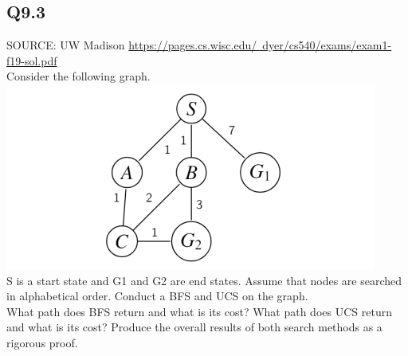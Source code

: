 \documentclass{article}
\begin{document}
\subsection*{Q9.3}
SOURCE: UW Madison \href{https://pages.cs.wisc.edu/~dyer/cs540/exams/exam1-f19-sol.pdf}{https://pages.cs.wisc.edu/~dyer/cs540/exams/exam1-f19-sol.pdf}
\\ Consider the following graph.
\\ \includegraphics{UCS_question_graph.png}
\\ S is a start state and G1 and G2 are end states. Assume that nodes are searched in alphabetical order. Conduct a BFS and UCS on the graph.
\\ What path does BFS return and what is its cost? What path does UCS return and what is its cost? Produce the overall
results of both search methods as a rigorous proof.
\newpage
\end{document}
